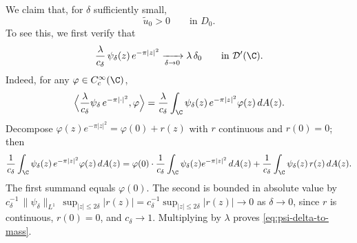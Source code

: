 We claim that, for $\delta$ sufficiently small,
\[
\widetilde u_0>0 \qquad \text{in } D_0.
\]
To see this, we first verify that
\begin{equation}\label{eq:psi-delta-to-mass}
\frac{\lambda}{c_\delta}\,\psi_\delta(z)\,e^{-\pi|z|^2}\xrightarrow[\delta\to 0]{}\lambda\,\delta_0
\qquad \text{in }\mathcal D'(\C).
\end{equation}
Indeed, for any $\varphi\in C_c^\infty(\C)$,
\[
\Big\langle \frac{\lambda}{c_\delta}\psi_\delta\, e^{-\pi|\cdot|^2},\varphi\Big\rangle
=
\frac{\lambda}{c_\delta}\int_\C \psi_\delta(z)\,e^{-\pi|z|^2}\varphi(z)\,dA(z).
\]
Decompose $\varphi(z)e^{-\pi|z|^2}=\varphi(0)+r(z)$ with $r$ continuous and $r(0)=0$; then
\[
\frac{1}{c_\delta}\int_\C \psi_\delta(z)\,e^{-\pi|z|^2}\varphi(z)\,dA(z)
=
\varphi(0)\cdot\frac{1}{c_\delta}\int_\C\psi_\delta(z)e^{-\pi|z|^2}\,dA(z)
+
\frac{1}{c_\delta}\int_\C\psi_\delta(z)\,r(z)\,dA(z).
\]
The first summand equals $\varphi(0)$. The second is bounded in absolute value by $c_\delta^{-1}\,\|\psi_\delta\|_{L^1}\,\sup_{|z|\le 2\delta}|r(z)|=c_\delta^{-1}\sup_{|z|\le 2\delta}|r(z)|\to 0$ as $\delta\to 0$, since $r$ is continuous, $r(0)=0$, and $c_\delta\to 1$. Multiplying by $\lambda$ proves \eqref{eq:psi-delta-to-mass}.

